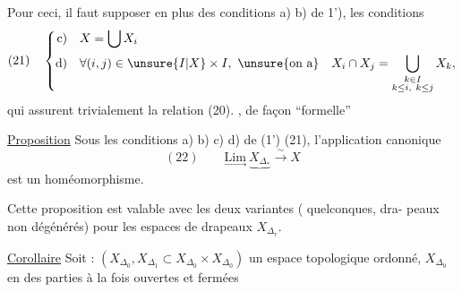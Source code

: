 Pour ceci, il faut supposer en plus des
conditions a) b) de 1'), les conditions
\[
(21)\quad\left\{\begin{aligned}
\text{c)}\quad&X=\bigcup X_i\\
\text{d)}\quad&\forall(i,j)\in\unsure{I|X}\times I,\ \text{\unsure{on a}}\quad
X_i\cap X_j=\bigcup_{\substack{k\in I\\k\leq i,\ k\leq j}}X_k,
\end{aligned}\right.
\]
qui assurent trivialement la relation (20).
, de façon  ``formelle'' \unsure{:|;}

\uline{Proposition} Sous les conditions a) b) c) d)
de (1') (21), l'application canonique
\[
(22)\qquad\underset{\longrightarrow}{\mathrm{Lim}}\ \underbrace{X_{\Delta_*}}\xrightarrow{\sim}X
\]
est un homéomorphisme.

Cette proposition est valable avec les
deux variantes ( quelconques, dra-
peaux non dégénérés) pour les
espaces de drapeaux $X_{\Delta_r}$.

\uline{Corollaire} Soit : $(X_{\Delta_0},X_{\Delta_1}\subset X_{\Delta_0}\times X_{\Delta_0})$
un espace topologique ordonné, 
  $X_{\Delta_0}$ en des parties à la fois ouvertes et fermées
